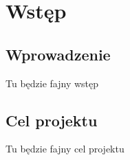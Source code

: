 \chapter{Wstęp}
\section{Wprowadzenie}

Tu będzie fajny wstęp


\section{Cel projektu}

Tu będzie fajny cel projektu
